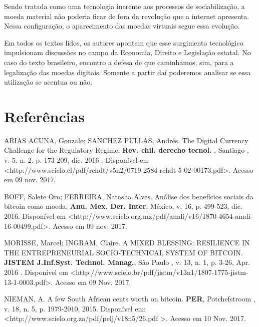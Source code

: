 \documentclass[12pt]{article}
\begin{document}
Sendo tratada como uma tecnologia inerente aos processos de sociabilização, a moeda material não poderia ficar de fora da revolução que a internet apresenta. Nessa configuração, o aparecimento das moedas virtuais segue essa evolução.

Em todos os textos lidos, os autores apontam que esse surgimento tecnológico impulsionam discussões no campo da Economia, Direito e Legislação estatal. No caso do texto brasileiro, encontro a defesa de que caminhamos, sim, para a legalização das moedas digitais. Somente a partir daí poderemos analisar se essa utilização se acentua ou não.

\section{Referências}

ARIAS ACUNA, Gonzalo; SANCHEZ PULLAS, Andrés. The Digital Currency Challenge for the Regulatory Regime. \textbf{Rev. chil. derecho tecnol.}  , Santiago , v. 5, n. 2, p. 173-209, dic. 2016 . Disponível em \textless http://www.scielo.cl/pdf/rchdt/v5n2/0719-2584-rchdt-5-02-00173.pdf\textgreater. Acesso em 09 nov. 2017.

BOFF, Salete Oro; FERREIRA, Natasha Alves. Análise dos benefícios sociais da bitcoin como moeda. \textbf{Anu. Mex. Der. Inter}, México, v. 16, p. 499-523, dic. 2016. Disponível em \textless http://www.scielo.org.mx/pdf/amdi/v16/1870-4654-amdi-16-00499.pdf\textgreater. Acesso em 09 nov. 2017.

MORISSE, Marcel; INGRAM, Claire. A MIXED BLESSING: RESILIENCE IN THE ENTREPRENEURIAL SOCIO-TECHNICAL SYSTEM OF BITCOIN. \textbf{ JISTEM J.Inf.Syst. Technol. Manag.},  São Paulo ,  v. 13, n. 1, p. 3-26,  Apr.  2016 .   Disponível em \textless http://www.scielo.br/pdf/jistm/v13n1/1807-1775-jistm-13-1-0003.pdf\textgreater. Acesso em  09  Nov.  2017.

NIEMAN, A. A few South African cents worth on bitcoin. \textbf{PER}, Potchefstroom ,  v. 18, n. 5, p. 1979-2010, 2015.   Disponível em: \textless http://www.scielo.org.za/pdf/pelj/v18n5/26.pdf \textgreater. Acesso em  10  Nov.  2017.
\end{document}
